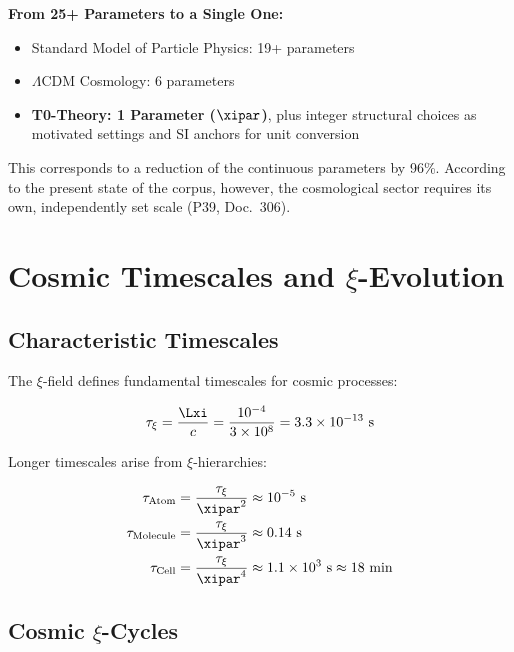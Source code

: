 	\begin{revolutionary}
		\textbf{From 25+ Parameters to a Single One:}
		
		\begin{itemize}
			\item Standard Model of Particle Physics: 19+ parameters
			\item $\Lambda$CDM Cosmology: 6 parameters
			\item \textbf{T0-Theory: 1 Parameter ($\xipar$)}, plus integer structural choices as motivated settings and SI anchors for unit conversion
		\end{itemize}
		
		This corresponds to a reduction of the continuous parameters by 96\%. According to the present state of the corpus, however, the cosmological sector requires its own, independently set scale (P39, Doc.~306).
	\end{revolutionary}
	
	\section{Cosmic Timescales and $\xi$-Evolution}
	
	\subsection{Characteristic Timescales}
	
	The $\xi$-field defines fundamental timescales for cosmic processes:
	
	\begin{equation}
		\tau_\xi = \frac{\Lxi}{c} = \frac{10^{-4}}{3 \times 10^8} = 3.3 \times 10^{-13} \text{ s}
	\end{equation}
	
	Longer timescales arise from $\xi$-hierarchies:
	
	\begin{align}
		\tau_{\text{Atom}} &= \frac{\tau_\xi}{\xipar^2} \approx 10^{-5} \text{ s} \\
		\tau_{\text{Molecule}} &= \frac{\tau_\xi}{\xipar^3} \approx 0.14 \text{ s} \\
		\tau_{\text{Cell}} &= \frac{\tau_\xi}{\xipar^4} \approx 1.1 \times 10^3 \text{ s} \approx 18 \text{ min}
	\end{align}
	
	\subsection{Cosmic $\xi$-Cycles}
	
